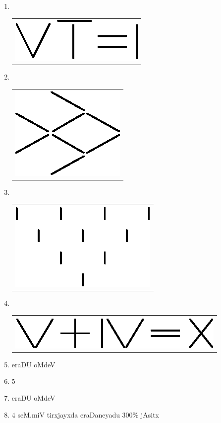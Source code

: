 \begin{enumerate}
\item 
~

  \vskip -0.4cm
  
\begin{tabular}[t]{c}
\centering
\includegraphics{src/figures/ans40.eps}
\end{tabular}

\bigskip

\item 
~

  \vskip -0.4cm
  
\begin{tabular}[t]{c}
\centering
\includegraphics{src/figures/ans41.eps}
\end{tabular}

\bigskip

\item 
~

  \vskip -0.4cm
  
\begin{tabular}[t]{c}
\centering
\includegraphics{src/figures/ans42.eps}
\end{tabular}

\bigskip

\item 
~

  \vskip -0.4cm
  
\begin{tabular}[t]{c}
\centering
\includegraphics{src/figures/ans43.eps}
\end{tabular}

\item eraDU oMdeV
  
\item  $5$

\item eraDU oMdeV 

\item $4$ seM.miV tirxjayxda eraDaneyadu $300\%$ jAsitx
 
\end{enumerate}
